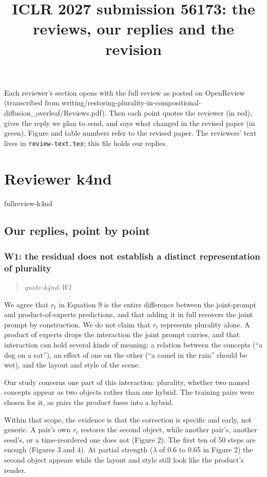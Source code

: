 \documentclass[11pt]{article}
\title{ICLR 2027 submission 56173: the reviews, our replies and the revision}
\date{}
\def\showfullreviews{}   %
\def\showquotes{}        %
\newcommand{\fullreview}[1]{\ifdefined\showfullreviews\csname fullreview-#1\endcsname\fi}
\newcommand{\reviewquote}[2]{\ifdefined\showquotes\begin{quote}\color{rev}\itshape\csname quote-#1-#2\endcsname\end{quote}\fi}
\begin{document}
\maketitle
Each reviewer's section opens with the full review as posted on OpenReview (transcribed from writing/restoring-plurality-in-compositional-diffusion_overleaf/Reviews.pdf). Then each point quotes the reviewer (in red), gives the reply we plan to send, and says what changed in the revised paper (in green). Figure and table numbers refer to the revised paper. The reviewers' text lives in \texttt{review-text.tex}; this file holds our replies.

\section*{Reviewer k4nd}
\fullreview{k4nd}

\subsection*{Our replies, point by point}

\subsubsection*{W1: the residual does not establish a distinct representation of plurality}
\reviewquote{k4nd}{W1}

We agree that $r_t$ in Equation 9 is the entire difference between the joint-prompt and product-of-experts predictions, and that adding it in full recovers the joint prompt by construction. We do not claim that $r_t$ represents plurality alone. A product of experts drops the interaction the joint prompt carries, and that interaction can hold several kinds of meaning: a relation between the concepts (``a dog on a cat''), an effect of one on the other (``a camel in the rain'' should be wet), and the layout and style of the scene.

Our study concerns one part of this interaction: plurality, whether two named concepts appear as two objects rather than one hybrid. The training pairs were chosen for it, as pairs the product fuses into a hybrid.

Within that scope, the evidence is that the correction is specific and early, not generic. A pair's own $r_t$ restores the second object, while another pair's, another seed's, or a time-reordered one does not (Figure 2). The first ten of 50 steps are enough (Figures 3 and 4). At partial strength ($\lambda$ of 0.6 to 0.65 in Figure 2) the second object appears while the layout and style still look like the product's render.
\end{document}
